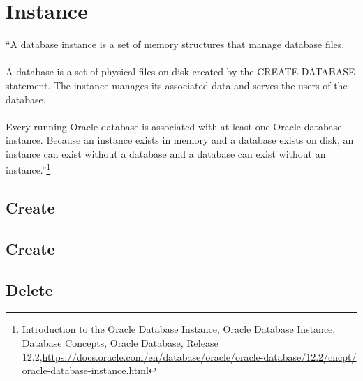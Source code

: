 
\newpage
\setcounter{secnumdepth}{0}

\section{Instance}

``A database instance is a set of memory structures that manage 
database files.\\
\\
A database is a set of physical files on disk created by the 
CREATE DATABASE statement.  The instance manages its associated 
data and serves the users of the database.\\
\\
Every running Oracle database is associated with at least one 
Oracle database instance.  Because an instance exists in memory
and a database exists on disk, an instance can exist without a 
database and a database can exist without an instance.''\footnote{Introduction to the Oracle Database Instance, Oracle Database Instance, Database Concepts, Oracle Database,
    Release 12.2,\href{https://docs.oracle.com/en/database/oracle/oracle-database/12.2/cncpt/oracle-database-instance.html}{https://docs.oracle.com/en/database/oracle/oracle-database/12.2/cncpt/}\newline
  \href{https://docs.oracle.com/en/database/oracle/oracle-database/12.2/cncpt/oracle-database-instance.html}{oracle-database-instance.html}}

\subsection{Create}


\subsection{Create}


\subsection{Delete}
